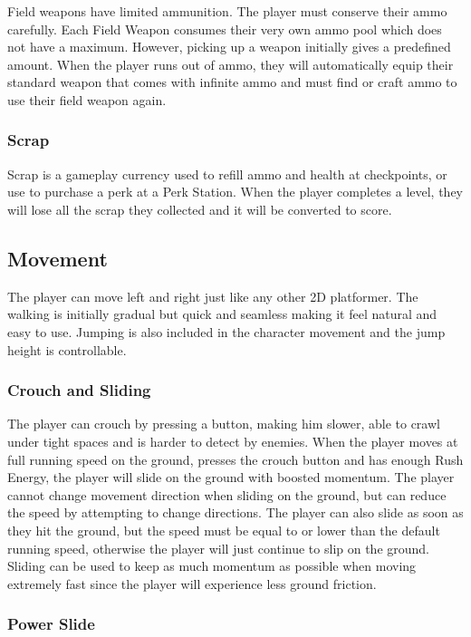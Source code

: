 \documentclass[12pt]{article}
\begin{document}
Field weapons have limited ammunition. The player must conserve their ammo carefully. Each Field Weapon consumes their very own ammo pool which does not have a maximum. However, picking up a weapon initially gives a predefined amount. When the player runs out of ammo, they will automatically equip their standard weapon that comes with infinite ammo and must find or craft ammo to use their field weapon again. 

\subsubsection{Scrap}

Scrap is a gameplay currency used to refill ammo and health at checkpoints, or use to purchase a perk at a Perk Station. When the player completes a level, they will lose all the scrap they collected and it will be converted to score. 

\subsection{Movement}

The player can move left and right just like any other 2D platformer. The walking is initially gradual but quick and seamless making it feel natural and easy to use. Jumping is also included in the character movement and the jump height is controllable.

\subsubsection{Crouch and Sliding}

The player can crouch by pressing a button, making him slower, able to crawl under tight spaces and is harder to detect by enemies. When the player moves at full running speed on the ground, presses the crouch button and has enough Rush Energy, the player will slide on the ground with boosted momentum. The player cannot change movement direction when sliding on the ground, but can reduce the speed by attempting to change directions. The player can also slide as soon as they hit the ground, but the speed must be equal to or lower than the default running speed, otherwise the player will just continue to slip on the ground. Sliding can be used to keep as much momentum as possible when moving extremely fast since the player will experience less ground friction. 

\subsubsection{Power Slide}
\end{document}
